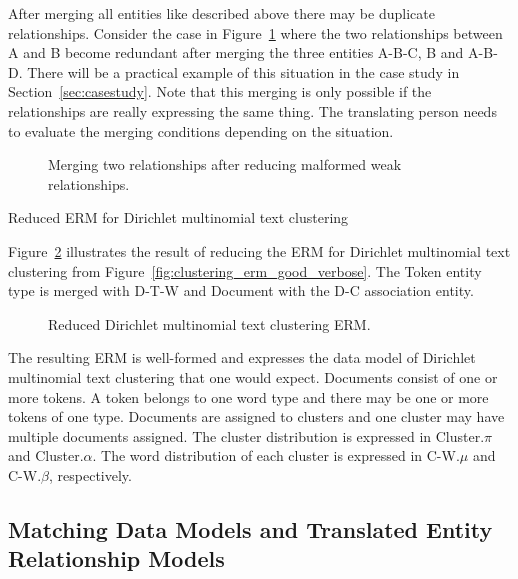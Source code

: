 After merging all entities like described above there may be duplicate relationships. Consider the case in Figure~\ref{fig:erm_reduction_minimal_example} where the two relationships between A and B become redundant after merging the three entities A-B-C, B and A-B-D. There will be a practical example of this situation in the case study in Section~\ref{sec:casestudy}. Note that this merging is only possible if the relationships are really expressing the same thing. The translating person needs to evaluate the merging conditions depending on the situation.

\begin{figure}[t]
\centering
\scalebox{\tikzScale}{\adjustTikzSize }
\caption{Merging two relationships after reducing malformed weak relationships.}\label{fig:erm_reduction_minimal_example}
\end{figure}

\begin{Example}{Reduced ERM for Dirichlet multinomial text clustering}

Figure~\ref{fig:clustering_erm_good_reduced} illustrates the result of reducing the ERM for Dirichlet multinomial text clustering from Figure~\ref{fig:clustering_erm_good_verbose}. The Token entity type is merged with D-T-W and Document with the D-C association entity.

\begin{figure}[h]
\centering
\scalebox{\tikzScale}{\adjustTikzSize }
\caption{Reduced Dirichlet multinomial text clustering ERM.}\label{fig:clustering_erm_good_reduced}
\end{figure}

The resulting ERM is well-formed and expresses the data model of Dirichlet multinomial text clustering that one would expect. Documents consist of one or more tokens. A token belongs to one word type and there may be one or more tokens of one type. Documents are assigned to clusters and one cluster may have multiple documents assigned. The cluster distribution is expressed in Cluster.$\pi$ and Cluster.$\alpha$. The word distribution of each cluster is expressed in C-W.$\mu$ and C-W.$\beta$, respectively.

\end{Example}

\subsection{Matching Data Models and Translated Entity Relationship Models}
\label{sec:erm_matching}

